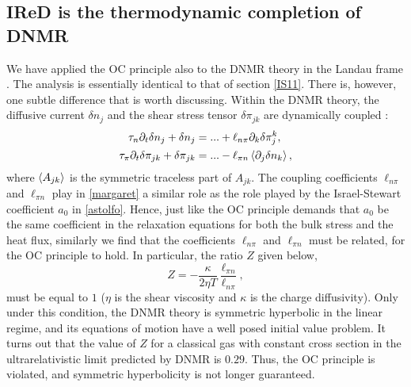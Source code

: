 \documentclass[a4paper, amsfonts, amssymb, amsmath, reprint, showkeys, nofootinbib, twoside, onecolumn,notitlepage]{revtex4-1}
\begin{document}
\subsection{IReD is the thermodynamic completion of DNMR}

We have applied the OC principle also to the DNMR theory in the Landau frame \cite{DMNR2012}. The analysis is essentially identical to that of section \ref{IS11}. There is, however, one subtle difference that is worth discussing. Within the DNMR theory, the diffusive current $\delta n_j$ and the shear stress tensor $\delta \pi_{jk}$ are dynamically coupled \cite{Sammet2023}:
\begin{equation}\label{margaret}
\begin{split}
 \tau_n \partial_t \delta n_j +\delta n_j ={}& ...+\ell_{n\pi}\partial_k \delta \pi^k_j , \\
\tau_\pi \partial_t \delta \pi_{jk} + \delta \pi_{jk} ={}&  ...-\ell_{\pi n} \braket{\partial_j \delta n_k} ,\\
\end{split}
\end{equation}
where $\braket{A_{jk}}$ is the symmetric traceless part of $A_{jk}$. The coupling coefficients $\ell_{n\pi}$ and $\ell_{\pi n}$ play in \eqref{margaret} a similar role as the role played by the Israel-Stewart coefficient $a_0$ in \eqref{astolfo}. Hence, just like the OC principle demands that $a_0$ be the same coefficient in the relaxation equations for both the bulk stress and the heat flux, similarly we find that the coefficients $\ell_{n\pi}$ and $\ell_{\pi n}$ must be related, for the OC principle to hold. In particular, the ratio $Z$ given below,
\begin{equation}
Z= -\dfrac{\kappa}{2\eta T} \dfrac{\ell_{\pi n}}{\ell_{n\pi}},
\end{equation}
must be equal to $1$ ($\eta$ is the shear viscosity and $\kappa$ is the charge diffusivity). Only under this condition, the DNMR theory is symmetric hyperbolic in the linear regime, and its equations of motion have a well posed initial value problem. It turns out that the value of $Z$ for a classical gas with constant cross section in the ultrarelativistic limit predicted by DNMR \cite{DMNR2012} is $0.29$. Thus, the OC principle is violated, and symmetric hyperbolicity is not longer guaranteed. 
\end{document}
